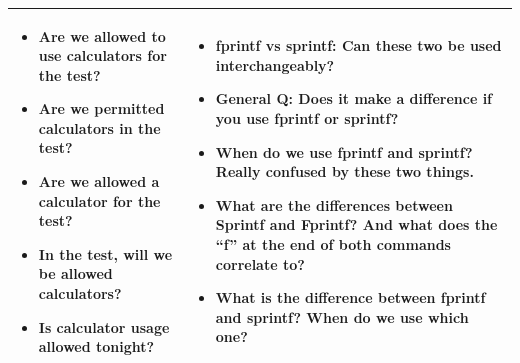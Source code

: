 \begin{table}[H]
\begin{tabularx}{\textwidth}{X X}
\begin{itemize}
\item Are we allowed to use calculators for the test?
\item Are we permitted calculators in the test?
\item Are we allowed a calculator for the test?
\item In the test, will we be allowed calculators?
\item Is calculator usage allowed tonight?
\end{itemize}
&
\begin{itemize}
\item fprintf vs sprintf: Can these two be used interchangeably?
\item General Q: Does it make a difference if you use fprintf or sprintf?
\item When do we use fprintf and sprintf? Really confused by these two things.
\item What are the differences between Sprintf and Fprintf? And what does the “f” at the end of both commands correlate to?
\item What is the difference between fprintf and sprintf? When do we use which one?
\end{itemize} \\
\bottomrule
\end{tabularx}
\end{table}
